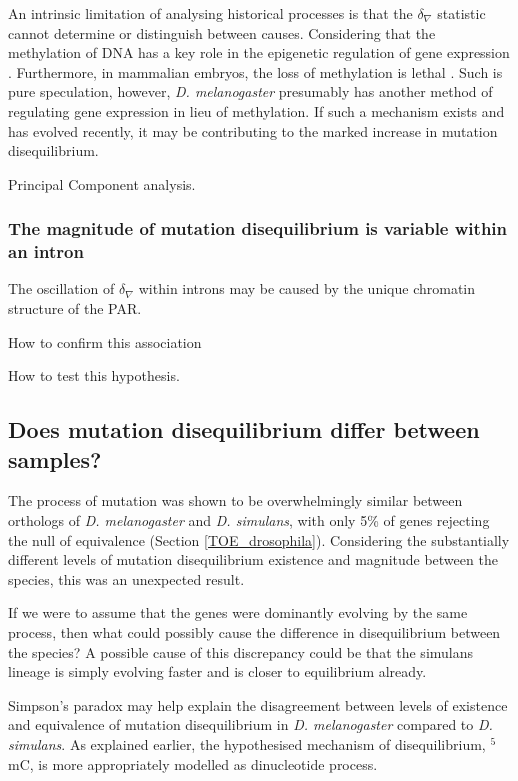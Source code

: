An intrinsic limitation of analysing historical processes is that the $\delta_\nabla$ statistic cannot determine or distinguish between causes. Considering that the methylation of DNA has a key role in the epigenetic regulation of gene expression \citep{Holliday1975DNADevelopment, Compere1981DNACells, Lieberman1983UltravioletDemethylation}. Furthermore, in mammalian embryos, the loss of methylation is lethal \citep{Panning1996DNAGenes}. Such is pure speculation, however, \textit{D. melanogaster} presumably has another method of regulating gene expression in lieu of methylation. If such a mechanism exists and has evolved recently, it may be contributing to the marked increase in mutation disequilibrium. 

Principal Component analysis. 

\subsubsection{The magnitude of mutation disequilibrium is variable within an intron}

The oscillation of $\delta_\nabla$ within introns may be caused by the unique chromatin structure of the PAR. 

How to confirm this association

How to test this hypothesis. 




\subsection{Does mutation disequilibrium differ between samples?}

The process of mutation was shown to be overwhelmingly similar between orthologs of \textit{D. melanogaster} and \textit{D. simulans}, with only 5\% of genes rejecting the null of equivalence (Section \ref{TOE_drosophila}). Considering the substantially different levels of mutation disequilibrium existence and magnitude between the species, this was an unexpected result. 

If we were to assume that the genes were dominantly evolving by the same process, then what could possibly cause the difference in disequilibrium between the species? A possible cause of this discrepancy could be that the simulans lineage is simply evolving faster and is closer to equilibrium already. 

Simpson's paradox may help explain the disagreement between levels of existence and equivalence of mutation disequilibrium in \textit{D. melanogaster} compared to \textit{D. simulans}. As explained earlier, the hypothesised mechanism of disequilibrium, $^5$mC, is more appropriately modelled as dinucleotide process. 

